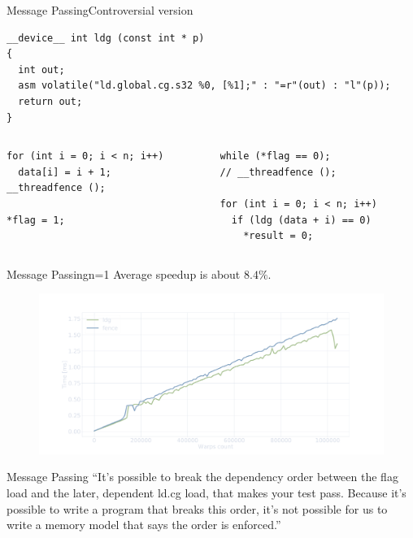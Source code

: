 \documentclass[aspectratio=169,compress]{beamer}
\begin{document}
\begin{frame}[fragile]{Message Passing}{Controversial version}
\centering
\begin{lstlisting}[showstringspaces=false]
__device__ int ldg (const int * p)
{
  int out;
  asm volatile("ld.global.cg.s32 %0, [%1];" : "=r"(out) : "l"(p));
  return out;
}
\end{lstlisting}

\begin{columns}[T]
	\begin{column}{0.45\textwidth}
\begin{lstlisting}[title={Writer}]
for (int i = 0; i < n; i++)
  data[i] = i + 1;
__threadfence ();

*flag = 1;
\end{lstlisting}
\end{column}

\begin{column}{0.45\textwidth}
\begin{lstlisting}[title={Reader}]
while (*flag == 0);
// __threadfence ();

for (int i = 0; i < n; i++)
  if (ldg (data + i) == 0)
    *result = 0;
\end{lstlisting}
			\end{column}
	\end{columns}
\end{frame}

\begin{frame}[fragile]{Message Passing}{n=1}
\centering
Average speedup is about $8.4\%$.

\centering
	\begin{figure}
		\includegraphics[width=\textwidth]{n1.pdf}
	\end{figure}
\end{frame}

\begin{frame}[fragile]{Message Passing}{}
``It’s possible to break the dependency order between the flag load and the later, dependent ld.cg load, 
that makes your test pass. Because it’s possible to write a program that breaks this order, 
it’s not possible for us to write a memory model that says the order is enforced.'' 
\end{frame}
\end{document}
